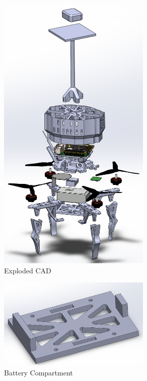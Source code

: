 \documentclass[12pt, titlepage]{article}
\begin{document}
\begin{figure}[h!]
  \begin{center} 
  \caption{Exploded CAD}
  \label{ExplodedCAD}
        \includegraphics[width=0.65\textwidth]{CAD_Exploded.png}
  \end{center}
\end{figure}

\begin{figure}[h!]
  \begin{center} 
  \caption{Battery Compartment}
  \label{Battery Compartment}
        \includegraphics[width=0.65\textwidth]{CAD_BottomPlate.png}
  \end{center}
\end{figure}
\end{document}
